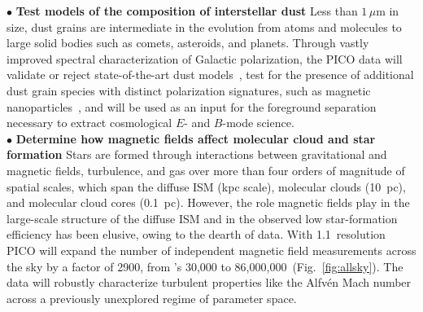 \documentclass[PICOAPC.tex]{subfiles}
\begin{document}
$\bullet$ {\bf Test models of the composition of interstellar dust} \hspace{0.1in}  
Less than $1\,\mu$m in size, dust grains are intermediate in the evolution from atoms and molecules to large solid bodies such as comets, asteroids, and planets. Through vastly improved spectral characterization of Galactic polarization, the PICO data will 
validate or reject state-of-the-art dust models~\citep[e.g.][]{Draine2009,Guillet2018}, test for the presence of additional dust grain species with distinct polarization signatures, such as magnetic nanoparticles~\citep{Draine2013}, and will be used as an input for the foreground separation necessary to extract cosmological $E$- and $B$-mode science. \\
$\bullet$ {\bf Determine how magnetic fields affect molecular cloud and star formation} \hspace{0.1in}
Stars are formed through interactions between gravitational and magnetic fields, turbulence, and gas over more than four orders of magnitude of spatial scales, which span the diffuse ISM (kpc scale), molecular clouds (10~pc), and molecular cloud cores (0.1~pc). However, the role magnetic fields play in the large-scale structure of the diffuse \ac{ISM} and in the observed low star-formation efficiency has been elusive, owing to the dearth of data. 
With 1.1\arcmin~resolution PICO will expand the number of independent magnetic field measurements across the sky by a factor of 2900, from \planck 's  30,000 to 86,000,000~(Fig.~\ref{fig:allsky}). The data will robustly characterize turbulent properties like the Alfv\'{e}n Mach number across a previously unexplored regime of parameter space. 
\end{document}
